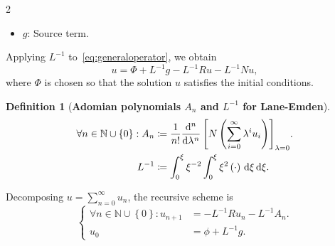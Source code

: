 \documentclass[
    landscape,
    paperwidth=48in,
    paperheight=36in,
    fontscale=0.3
]{baposter}
\theoremstyle{definition}
\newtheorem{definition}{Definition}
\begin{document}
\begin{poster}
{\begin{multicols}{2}
\begin{itemize}
            \item $g$: Source term.
        \end{itemize}
    \end{multicols}
    \vspace*{-\baselineskip}\setlength\belowdisplayshortskip{0pt}
    Applying $L^{-1}$ to~\eqref{eq:generaloperator}, we obtain
    \begin{equation*}
        u=
        \Phi+
        L^{-1}g-
        L^{-1}Ru-
        L^{-1}Nu,
    \end{equation*}
    where $\Phi$ is chosen so that the solution $u$ satisfies the initial conditions.
    \begin{definition}[\bfseries Adomian polynomials $A_{n}$ and $L^{-1}$ for Lane-Emden]
        \begin{align*}
            \forall n\in\mathbb{N}\cup\left\{0\right\}:
            A_{n}  & \coloneqq
            \frac{1}{n!}
            \diff*[n]{
                \left[
                    N\left(
                    \sum_{i=0}^{\infty}
                    \lambda^{i}
                    u_{i}
                    \right)
            \right]_{\lambda=0}}{\lambda}. \\
            L^{-1} & \coloneqq
            \int_{0}^{\xi}
            \xi^{-2}
            \int_{0}^{\xi}
            \xi^{2}\left(\cdot\right)
            \dl \xi
            \dl \xi.
        \end{align*}
    \end{definition}
    \vspace*{-.5\baselineskip}\setlength\belowdisplayshortskip{0pt}
    Decomposing $u=\sum\limits_{n=0}^{\infty}u_{n}$,
    the recursive scheme is
    \begin{equation}\label{eq:adm_system}
        \boxed{
            \left\{
            \begin{aligned}
                \forall n\in\mathbb{N}\cup\left\{0\right\}:
                u_{n+1} & =
                -L^{-1}Ru_{n}-L^{-1}A_{n}. \\
                u_{0}   & =
                \phi+L^{-1}g.
            \end{aligned}
            \right.
        }
    \end{equation}
    }


\end{poster}
\end{document}
